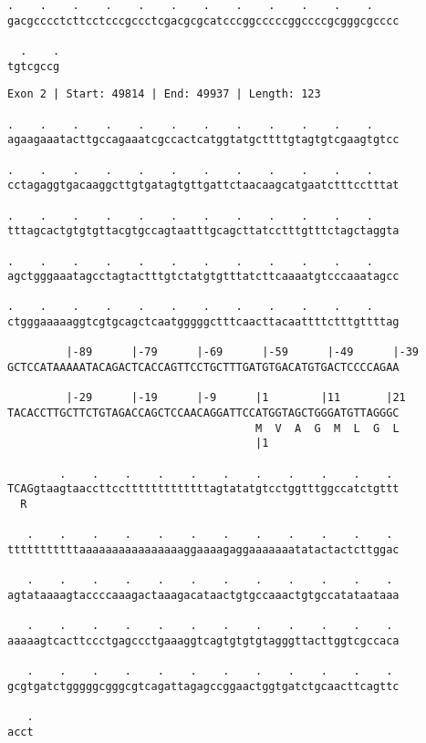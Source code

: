 \documentclass{article}
\begin{document}
\newpage
\begin{Verbatim}[fontfamily=courier]
  .    .    .    .    .    .    .    .    .    .    .    .  
gacgcccctcttcctcccgccctcgacgcgcatcccggcccccggccccgcgggcgcccc

  .    .
tgtcgccg
\end{Verbatim}
\newpage
\begin{Verbatim}[fontfamily=courier]
Exon 2 | Start: 49814 | End: 49937 | Length: 123

.    .    .    .    .    .    .    .    .    .    .    .    
agaagaaatacttgccagaaatcgccactcatggtatgcttttgtagtgtcgaagtgtcc

.    .    .    .    .    .    .    .    .    .    .    .    
cctagaggtgacaaggcttgtgatagtgttgattctaacaagcatgaatctttcctttat

.    .    .    .    .    .    .    .    .    .    .    .    
tttagcactgtgtgttacgtgccagtaatttgcagcttatcctttgtttctagctaggta

.    .    .    .    .    .    .    .    .    .    .    .    
agctgggaaatagcctagtactttgtctatgtgtttatcttcaaaatgtcccaaatagcc

.    .    .    .    .    .    .    .    .    .    .    .    
ctgggaaaaaggtcgtgcagctcaatgggggctttcaacttacaattttctttgttttag

         |-89      |-79      |-69      |-59      |-49      |-39
GCTCCATAAAAATACAGACTCACCAGTTCCTGCTTTGATGTGACATGTGACTCCCCAGAA

         |-29      |-19      |-9      |1        |11       |21
TACACCTTGCTTCTGTAGACCAGCTCCAACAGGATTCCATGGTAGCTGGGATGTTAGGGC
                                      M  V  A  G  M  L  G  L
                                      |1                    

        .    .    .    .    .    .    .    .    .    .    . 
TCAGgtaagtaaccttcctttttttttttttagtatatgtcctggtttggccatctgttt
  R                                                         

   .    .    .    .    .    .    .    .    .    .    .    . 
tttttttttttaaaaaaaaaaaaaaaaggaaaagaggaaaaaaatatactactcttggac

   .    .    .    .    .    .    .    .    .    .    .    . 
agtataaaagtaccccaaagactaaagacataactgtgccaaactgtgccatataataaa

   .    .    .    .    .    .    .    .    .    .    .    . 
aaaaagtcacttccctgagccctgaaaggtcagtgtgtgtagggttacttggtcgccaca

   .    .    .    .    .    .    .    .    .    .    .    . 
gcgtgatctgggggcgggcgtcagattagagccggaactggtgatctgcaacttcagttc

   .
acct
\end{Verbatim}
\end{document}
